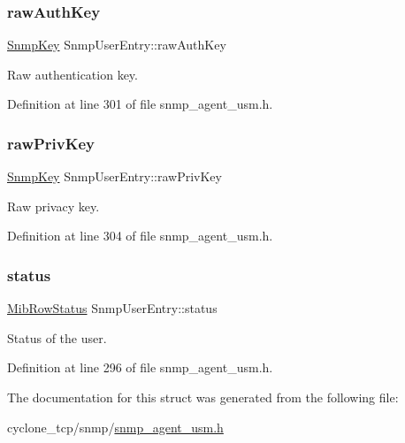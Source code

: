 \mbox{\label{structSnmpUserEntry_a32003a1f649e6244a8453157d6502f92}} 
\subsubsection{\texorpdfstring{raw\+Auth\+Key}{rawAuthKey}}
{\footnotesize\ttfamily \hyperlink{structSnmpKey}{Snmp\+Key} Snmp\+User\+Entry\+::raw\+Auth\+Key}



Raw authentication key. 



Definition at line 301 of file snmp\+\_\+agent\+\_\+usm.\+h.

\mbox{\label{structSnmpUserEntry_ac4445ac274e1da56ffb5c037c9f9cb46}} 
\subsubsection{\texorpdfstring{raw\+Priv\+Key}{rawPrivKey}}
{\footnotesize\ttfamily \hyperlink{structSnmpKey}{Snmp\+Key} Snmp\+User\+Entry\+::raw\+Priv\+Key}



Raw privacy key. 



Definition at line 304 of file snmp\+\_\+agent\+\_\+usm.\+h.

\mbox{\label{structSnmpUserEntry_add2c8c54d828652fa85a0697654e0573}} 
\subsubsection{\texorpdfstring{status}{status}}
{\footnotesize\ttfamily \hyperlink{mib__common_8h_a40ce1ea958f5c3b04f841d76f5557097}{Mib\+Row\+Status} Snmp\+User\+Entry\+::status}



Status of the user. 



Definition at line 296 of file snmp\+\_\+agent\+\_\+usm.\+h.



The documentation for this struct was generated from the following file\+:\begin{DoxyCompactItemize}
\item 
cyclone\+\_\+tcp/snmp/\hyperlink{snmp__agent__usm_8h}{snmp\+\_\+agent\+\_\+usm.\+h}\end{DoxyCompactItemize}
